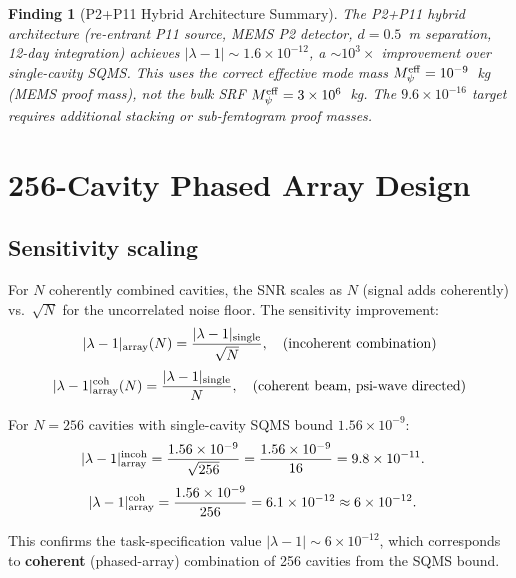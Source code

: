 \documentclass[11pt,twocolumn]{article}
\newcommand{\lam}{\lambda}
\newcommand{\Meff}{M_\psi^{\rm eff}}
\newcommand{\ee}[1]{\times 10^{#1}}
\newtheorem{finding}{Finding}[section]
\begin{document}
\begin{finding}[P2+P11 Hybrid Architecture Summary]
\label{find:hybrid_summary}
The P2+P11 hybrid architecture (re-entrant P11 source, MEMS P2 detector,
$d = 0.5$~m separation, 12-day integration) achieves $|\lam-1|\sim 1.6\ee{-12}$,
a $\sim 10^3\times$ improvement over single-cavity SQMS. This uses the
correct effective mode mass $\Meff = 10^{-9}$~kg (MEMS proof mass), not
the bulk SRF $\Meff = 3\ee{6}$~kg. The $9.6\ee{-16}$ target requires
additional stacking or sub-femtogram proof masses.
\end{finding}


\section{256-Cavity Phased Array Design}
\label{sec:phased_array}

\subsection{Sensitivity scaling}
\label{sec:array_scaling}

For $N$ coherently combined cavities, the SNR scales as $N$ (signal adds
coherently) vs.\ $\sqrt{N}$ for the uncorrelated noise floor.
The sensitivity improvement:
\begin{equation}
|\lam-1|_{\rm array}(N) = \frac{|\lam-1|_{\rm single}}{\sqrt{N}},
\quad\text{(incoherent combination)}
\label{eq:array_incoherent}
\end{equation}
\begin{equation}
|\lam-1|_{\rm array}^{\rm coh}(N)
= \frac{|\lam-1|_{\rm single}}{N},
\quad\text{(coherent beam, psi-wave directed)}
\label{eq:array_coherent}
\end{equation}

For $N = 256$ cavities with single-cavity SQMS bound $1.56\ee{-9}$:
\begin{align}
|\lam-1|_{\rm array}^{\rm incoh} &= \frac{1.56\ee{-9}}{\sqrt{256}}
= \frac{1.56\ee{-9}}{16} = 9.8\ee{-11}.
\label{eq:array_256_incoh}
\end{align}
\begin{align}
|\lam-1|_{\rm array}^{\rm coh} &= \frac{1.56\ee{-9}}{256}
= 6.1\ee{-12} \approx 6\ee{-12}.
\label{eq:array_256_coh}
\end{align}

This confirms the task-specification value $|\lam-1| \sim 6\ee{-12}$,
which corresponds to \textbf{coherent} (phased-array) combination of
256 cavities from the SQMS bound.
\end{document}
